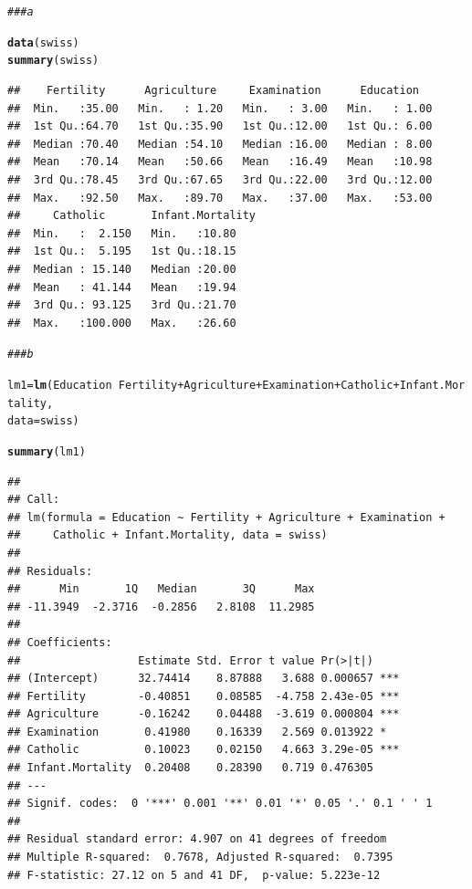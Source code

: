 \documentclass[12pt]{article}\usepackage[]{graphicx}\usepackage[]{color}
\makeatletter
\newcommand{\hlcom}[1]{\textcolor[rgb]{0.678,0.584,0.686}{\textit{#1}}}%
\newcommand{\hlopt}[1]{\textcolor[rgb]{0,0,0}{#1}}%
\newcommand{\hlstd}[1]{\textcolor[rgb]{0.345,0.345,0.345}{#1}}%
\newcommand{\hlkwb}[1]{\textcolor[rgb]{0.69,0.353,0.396}{#1}}%
\newcommand{\hlkwc}[1]{\textcolor[rgb]{0.333,0.667,0.333}{#1}}%
\newcommand{\hlkwd}[1]{\textcolor[rgb]{0.737,0.353,0.396}{\textbf{#1}}}%
\newenvironment{kframe}{%
 \def\at@end@of@kframe{}%
 \ifinner\ifhmode%
  \def\at@end@of@kframe{\end{minipage}}%
  \begin{minipage}{\columnwidth}%
 \fi\fi%
 \def\FrameCommand##1{\hskip\@totalleftmargin \hskip-\fboxsep
 \colorbox{shadecolor}{##1}\hskip-\fboxsep
     \hskip-\linewidth \hskip-\@totalleftmargin \hskip\columnwidth}%
 \MakeFramed {\advance\hsize-\width
   \@totalleftmargin\z@ \linewidth\hsize
   \@setminipage}}%
 {\par\unskip\endMakeFramed%
 \at@end@of@kframe}
\newenvironment{knitrout}{}{} %
\makeatother
\begin{document}
\begin{knitrout}
\color{fgcolor}\begin{kframe}
\begin{alltt}
\hlcom{### a}

\hlkwd{data}\hlstd{(swiss)}
\hlkwd{summary}\hlstd{(swiss)}
\end{alltt}
\begin{verbatim}
##    Fertility      Agriculture     Examination      Education    
##  Min.   :35.00   Min.   : 1.20   Min.   : 3.00   Min.   : 1.00  
##  1st Qu.:64.70   1st Qu.:35.90   1st Qu.:12.00   1st Qu.: 6.00  
##  Median :70.40   Median :54.10   Median :16.00   Median : 8.00  
##  Mean   :70.14   Mean   :50.66   Mean   :16.49   Mean   :10.98  
##  3rd Qu.:78.45   3rd Qu.:67.65   3rd Qu.:22.00   3rd Qu.:12.00  
##  Max.   :92.50   Max.   :89.70   Max.   :37.00   Max.   :53.00  
##     Catholic       Infant.Mortality
##  Min.   :  2.150   Min.   :10.80   
##  1st Qu.:  5.195   1st Qu.:18.15   
##  Median : 15.140   Median :20.00   
##  Mean   : 41.144   Mean   :19.94   
##  3rd Qu.: 93.125   3rd Qu.:21.70   
##  Max.   :100.000   Max.   :26.60
\end{verbatim}
\begin{alltt}
\hlcom{### b}

\hlstd{lm1} \hlkwb{=} \hlkwd{lm}\hlstd{(Education} \hlopt{~} \hlstd{Fertility} \hlopt{+} \hlstd{Agriculture} \hlopt{+} \hlstd{Examination} \hlopt{+} \hlstd{Catholic} \hlopt{+} \hlstd{Infant.Mortality,}
    \hlkwc{data} \hlstd{= swiss)}

\hlkwd{summary}\hlstd{(lm1)}
\end{alltt}
\begin{verbatim}
## 
## Call:
## lm(formula = Education ~ Fertility + Agriculture + Examination + 
##     Catholic + Infant.Mortality, data = swiss)
## 
## Residuals:
##      Min       1Q   Median       3Q      Max 
## -11.3949  -2.3716  -0.2856   2.8108  11.2985 
## 
## Coefficients:
##                  Estimate Std. Error t value Pr(>|t|)    
## (Intercept)      32.74414    8.87888   3.688 0.000657 ***
## Fertility        -0.40851    0.08585  -4.758 2.43e-05 ***
## Agriculture      -0.16242    0.04488  -3.619 0.000804 ***
## Examination       0.41980    0.16339   2.569 0.013922 *  
## Catholic          0.10023    0.02150   4.663 3.29e-05 ***
## Infant.Mortality  0.20408    0.28390   0.719 0.476305    
## ---
## Signif. codes:  0 '***' 0.001 '**' 0.01 '*' 0.05 '.' 0.1 ' ' 1
## 
## Residual standard error: 4.907 on 41 degrees of freedom
## Multiple R-squared:  0.7678,	Adjusted R-squared:  0.7395 
## F-statistic: 27.12 on 5 and 41 DF,  p-value: 5.223e-12
\end{verbatim}
\end{kframe}
\end{knitrout}
\end{document}
